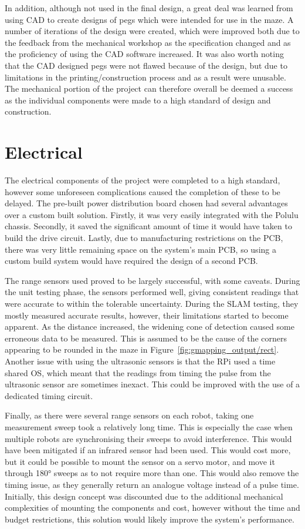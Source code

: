 In addition, although not used in the final design, a great deal was learned from
using CAD to create designs of pegs which were intended for use in the maze. A number
of iterations of the design were created, which were improved both due to the feedback from the mechanical workshop as the specification changed and as the proficiency of using the CAD software increased. It was also worth noting that the CAD designed pegs were not flawed
because of the design, but due to limitations in the printing/construction process and as a result were unusable.
The mechanical portion of the project can therefore overall be deemed a success as
the individual components were made to a high standard of design and construction.

\section{Electrical}\label{eval/elec}
The electrical components of the project were completed to a high standard,
however some unforeseen complications caused the completion of these to be delayed. The pre-built power distribution board chosen had several advantages over a
custom built solution. Firstly, it was very easily integrated with the Polulu
chassis. Secondly, it saved the significant amount of time it would have taken
to build the drive circuit. Lastly, due to manufacturing restrictions on the PCB,
there was very little remaining space on the system's main PCB, so using a custom
build system would have required the design of a second PCB.

The range sensors used proved to be largely successful, with some caveats.
During the unit testing phase, the sensors performed well, giving consistent
readings that were accurate to within the tolerable uncertainty. During the SLAM testing,
they mostly measured accurate results, however, their limitations started to
become apparent. As the distance increased, the widening cone of detection caused some
erroneous data to be measured. This is assumed to be the cause of the corners
appearing to be rounded in the maze in Figure~\ref{fig:gmapping_output/rect}. Another issue with using the ultrasonic sensors is that the RPi used a time
shared OS, which meant that the readings from timing the pulse from the
ultrasonic sensor are sometimes inexact. This could be improved with the use of
a dedicated timing circuit.

Finally, as there were several range sensors on each
robot, taking one measurement sweep took a relatively long time. This is
especially the case when multiple robots are synchronising their sweeps to avoid
interference. This would have been mitigated if an infrared sensor had been used.
This would cost more, but it could be possible to mount the sensor on a servo
motor, and move it through \ang{180} sweeps as to not require more than one.
This would also remove the timing issue, as they generally return an analogue
voltage instead of a pulse time. Initially, this design concept was discounted due to the additional mechanical complexities of mounting the components and
cost, however without the time and budget restrictions, this solution would
likely improve the system's performance.

